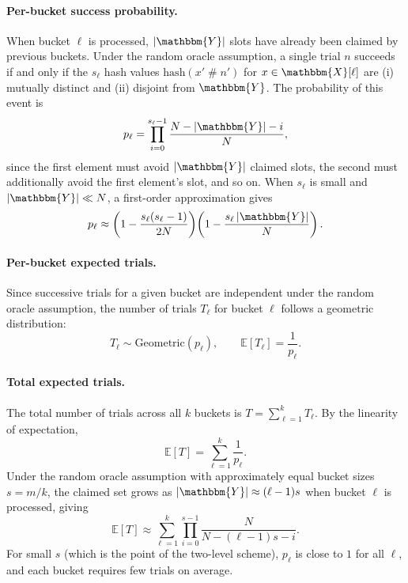 \documentclass[hidelinks,11pt,final]{article}
\theoremstyle{plain}
\newcommand{\cat}{\mathbin{\#}}
\newcommand{\geodist}{\mathrm{Geometric}}
\newcommand{\Expect}[1]{\mathbb{E}\left[#1\right]}
\begin{document}
\paragraph{Per-bucket success probability.}
When bucket $\ell$ is processed, $|\mathbbm{Y}|$ slots have already been claimed by previous buckets. Under the random oracle assumption, a single trial $n$ succeeds if and only if the $s_\ell$ hash values $\mathrm{hash}(x' \cat n')$ for $x \in \mathbbm{X}[\ell]$ are (i) mutually distinct and (ii) disjoint from $\mathbbm{Y}$. The probability of this event is
\begin{equation}
\label{eq:bucket_prob}
p_\ell = \prod_{i=0}^{s_\ell - 1} \frac{N - |\mathbbm{Y}| - i}{N},
\end{equation}
since the first element must avoid $|\mathbbm{Y}|$ claimed slots, the second must additionally avoid the first element's slot, and so on. When $s_\ell$ is small and $|\mathbbm{Y}| \ll N$, a first-order approximation gives
\begin{equation}
p_\ell \approx \left(1 - \frac{s_\ell(s_\ell - 1)}{2N}\right)\!\left(1 - \frac{s_\ell \, |\mathbbm{Y}|}{N}\right).
\end{equation}

\paragraph{Per-bucket expected trials.}
Since successive trials for a given bucket are independent under the random oracle assumption, the number of trials $T_\ell$ for bucket $\ell$ follows a geometric distribution:
\begin{equation}
T_\ell \sim \geodist(p_\ell), \qquad \Expect{T_\ell} = \frac{1}{p_\ell}.
\end{equation}

\paragraph{Total expected trials.}
The total number of trials across all $k$ buckets is $T = \sum_{\ell=1}^{k} T_\ell$. By the linearity of expectation,
\begin{equation}
\Expect{T} = \sum_{\ell=1}^{k} \frac{1}{p_\ell}.
\end{equation}
Under the random oracle assumption with approximately equal bucket sizes $s = m/k$, the claimed set grows as $|\mathbbm{Y}| \approx (\ell - 1) s$ when bucket $\ell$ is processed, giving
\begin{equation}
\Expect{T} \approx \sum_{\ell=1}^{k} \prod_{i=0}^{s-1} \frac{N}{N - (\ell-1)s - i}.
\end{equation}
For small $s$ (which is the point of the two-level scheme), $p_\ell$ is close to $1$ for all $\ell$, and each bucket requires few trials on average.
\end{document}
